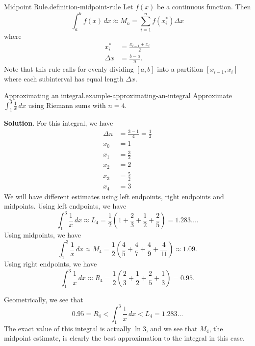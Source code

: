 \documentclass[10pt,]{book}
\numberwithin{equation}{section}
\begin{document}
\begin{definition}{Midpoint Rule.}{definition-midpoint-rule}%
\hypertarget{p-438}{}%
Let \(f(x)\) be a continuous function. Then%
\begin{equation*}
\int_{a}^{b}f(x)\,dx \approx M_{n} = \sum_{i=1}^{n}f(x_{i}^{*})\Delta x
\end{equation*}
where%
\begin{align*}
x_{i}^{*} & = \frac{x_{i-1}+x_{i}}{2} \\
\Delta x & = \frac{b-a}{n}. 
\end{align*}
Note that this rule calls for evenly dividing \([a,b]\) into a partition \([x_{i-1},x_{i}]\) where each subinterval has equal length \(\Delta x\).%
\end{definition}
\begin{example}{Approximating an integral.}{example-approximating-an-integral}%
\hypertarget{p-439}{}%
Approximate \(\int_{1}^{3}\frac{1}{x}\,dx\) using Riemann sums with \(n=4\).%
\par\smallskip%
\noindent\textbf{Solution}.\hypertarget{solution-96}{}\quad%
\hypertarget{p-440}{}%
For this integral, we have%
\begin{align*}
\Delta n & = \frac{3-1}{4} = \frac{1}{2} \\
x_{0} & = 1 \\
x_{1} & = \frac{3}{2} \\
x_{2} & = 2 \\
x_{3} & = \frac{5}{2} \\
x_{4} & = 3 
\end{align*}
We will have different estimates using left endpoints, right endpoints and midpoints. Using left endpoints, we have%
\begin{equation*}
\int_{1}^{3}\frac{1}{x}\,dx \approx L_{4} = \frac{1}{2}\left(1 + \frac{2}{3} + \frac{1}{2} + \frac{2}{5}\right) = 1.283....
\end{equation*}
Using midpoints, we have%
\begin{equation*}
\int_{1}^{3}\frac{1}{x}\,dx \approx M_{4} = \frac{1}{2}\left(\frac{4}{5} + \frac{4}{7} + \frac{4}{9} + \frac{4}{11}\right) \approx1.09.
\end{equation*}
Using right endpoints, we have%
\begin{equation*}
\int_{1}^{3}\frac{1}{x}\,dx \approx R_{4} = \frac{1}{2}\left(\frac{2}{3} + \frac{1}{2} + \frac{2}{5} + \frac{1}{3}\right) = 0.95.
\end{equation*}
%
\par
\hypertarget{p-441}{}%
Geometrically, we see that%
\begin{equation*}
0.95 = R_{4} < \int_{1}^{3}\frac{1}{x}\,dx < L_{4} = 1.283...
\end{equation*}
The exact value of this integral is actually \(\ln 3\), and we see that \(M_{4}\), the midpoint estimate, is clearly the best approximation to the integral in this case.%
\end{example}
\end{document}
